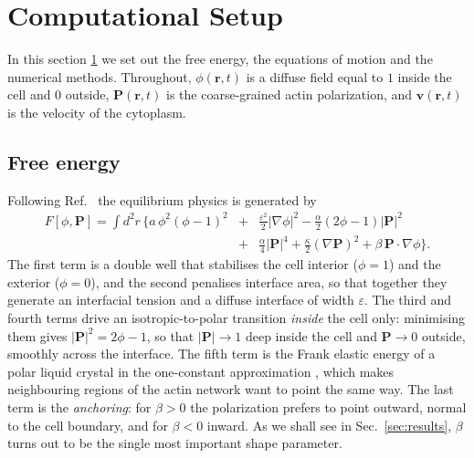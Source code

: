 \documentclass[11pt]{article}
\begin{document}
\section{Computational Setup}
\label{sec:model}

\noindent
In this section \ref{sec:model} we set out the free energy, the equations of
motion and the numerical methods. Throughout, $\phi(\mathbf{r},t)$ is a diffuse
field equal to $1$ inside the cell and $0$ outside, $\mathbf{P}(\mathbf{r},t)$ is
the coarse-grained actin polarization, and $\mathbf{v}(\mathbf{r},t)$ is the
velocity of the cytoplasm.

\noindent
\subsection{Free energy}
\label{subsec:freeenergy}

Following Ref.~\cite{Tjhung:2015} the equilibrium physics is generated by
\begin{eqnarray}\label{eq:F}
F[\phi,\mathbf{P}]=\int d^2r\,\Big\{
a\,\phi^{2}(\phi-1)^{2}
&+&\frac{\varepsilon^{2}}{2}|\nabla\phi|^{2}
-\frac{\alpha}{2}\left(2\phi-1\right)|\mathbf{P}|^{2}\nonumber\\
&+&\frac{\alpha}{4}|\mathbf{P}|^{4}
+\frac{\kappa}{2}\left(\nabla\mathbf{P}\right)^{2}
+\beta\,\mathbf{P}\cdot\nabla\phi\Big\}.
\end{eqnarray}
The first term is a double well that stabilises the cell interior
($\phi=1$) and the exterior ($\phi=0$), and the second penalises interface area,
so that together they generate an interfacial tension and a diffuse interface of
width $\varepsilon$. The third and fourth terms drive an isotropic-to-polar
transition \textit{inside} the cell only: minimising them gives
$|\mathbf{P}|^{2}=2\phi-1$, so that $|\mathbf{P}|\to1$ deep inside the cell and
$\mathbf{P}\to0$ outside, smoothly across the interface. The fifth term is the
Frank elastic energy of a polar liquid crystal in the one-constant approximation
\cite{deGennes:1993}, which makes neighbouring regions of the actin network want
to point the same way. The last term is the \textit{anchoring}: for $\beta>0$ the
polarization prefers to point outward, normal to the cell boundary, and for
$\beta<0$ inward. As we shall see in Sec.~\ref{sec:results}, $\beta$ turns out to
be the single most important shape parameter.
\end{document}
